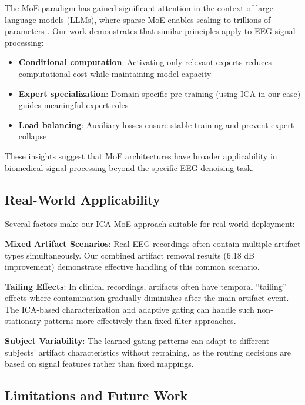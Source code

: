 \documentclass{article}
\begin{document}
The MoE paradigm has gained significant attention in the context of large language models (LLMs), where sparse MoE enables scaling to trillions of parameters \cite{fedus2022switch, jiang2024mixtral}. Our work demonstrates that similar principles apply to EEG signal processing:

\begin{itemize}
\item \textbf{Conditional computation}: Activating only relevant experts reduces computational cost while maintaining model capacity
\item \textbf{Expert specialization}: Domain-specific pre-training (using ICA in our case) guides meaningful expert roles
\item \textbf{Load balancing}: Auxiliary losses ensure stable training and prevent expert collapse
\end{itemize}

These insights suggest that MoE architectures have broader applicability in biomedical signal processing beyond the specific EEG denoising task.

\subsection{Real-World Applicability}

Several factors make our ICA-MoE approach suitable for real-world deployment:

\textbf{Mixed Artifact Scenarios}: Real EEG recordings often contain multiple artifact types simultaneously. Our combined artifact removal results (6.18 dB improvement) demonstrate effective handling of this common scenario.

\textbf{Tailing Effects}: In clinical recordings, artifacts often have temporal ``tailing'' effects where contamination gradually diminishes after the main artifact event. The ICA-based characterization and adaptive gating can handle such non-stationary patterns more effectively than fixed-filter approaches.

\textbf{Subject Variability}: The learned gating patterns can adapt to different subjects' artifact characteristics without retraining, as the routing decisions are based on signal features rather than fixed mappings.

\subsection{Limitations and Future Work}
\end{document}
